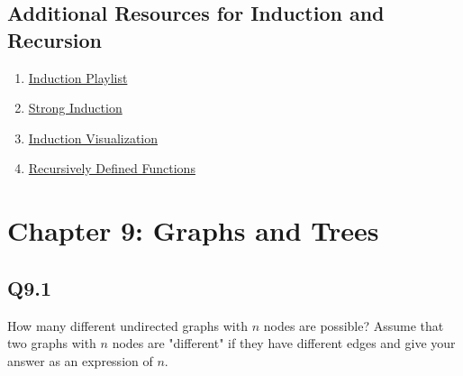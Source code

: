 \documentclass{article}
\begin{document}
\subsection*{Additional Resources for Induction and Recursion}
\begin{enumerate}
    \item \href{https://www.youtube.com/watch?v=IdTaA6iz3Mo&list=PL5KkMZvBpo5CnkA4bi7l6W62VPoYRbOEk&index=1}{Induction Playlist}
    \item \href{https://www.youtube.com/watch?v=-vJhahLdmLI}{Strong Induction}
    \item \href{https://www.youtube.com/watch?v=5Hn8vUE3cBQ}{Induction Visualization}
    \item \href{https://www.youtube.com/watch?v=5RB4H_12wOs}{Recursively Defined Functions}
\end{enumerate}
\newpage
\section*{Chapter 9: Graphs and Trees}

\subsection*{Q9.1}
How many different undirected graphs with $n$ nodes are possible? Assume that two graphs with $n$ nodes are "different" if they have different edges and give your answer as an expression of $n$.
\newpage
\end{document}
